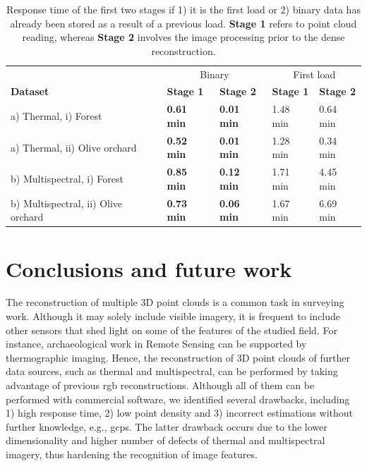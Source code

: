\renewcommand{\arraystretch}{1.2}
\begin{table}
    \sffamily
    \centering
    \caption{Response time of the first two stages if 1) it is the first load or 2) binary data has already been stored as a result of a previous load. \textbf{Stage 1} refers to point cloud reading, whereas \textbf{Stage 2} involves the image processing prior to the dense reconstruction. }
    \label{table:binary_results}
    \begin{tabular}{l|llll}
    \toprule
    & \multicolumn{2}{c}{Binary} & \multicolumn{2}{c}{First load}\\
    \cmidrule{1-5}
    \textbf{Dataset} & \textbf{Stage 1} & \textbf{Stage 2} & \textbf{Stage 1} & \textbf{Stage 2}\\
    \cmidrule{1-5}
    a) Thermal, i) Forest & \textbf{0.61 \si{\minute}} & \textbf{0.01 \si{\minute}} & 1.48 \si{\minute} & 0.64 \si{\minute}\\
    \cmidrule{1-5}
    a) Thermal, ii) Olive orchard & \textbf{0.52 \si{\minute}} & \textbf{0.01 \si{\minute}} & 1.28 \si{\minute} & 0.34 \si{\minute}\\
    \cmidrule{1-5}
    b) Multispectral, i) Forest & \textbf{0.85 \si{\minute}} & \textbf{0.12 \si{\minute}} & 1.71 \si{\minute} & 4.45 \si{\minute}\\
    \cmidrule{1-5}
    b) Multispectral, ii) Olive orchard & \textbf{0.73 \si{\minute}} & \textbf{0.06 \si{\minute}} & 1.67 \si{\minute} & 6.69 \si{\minute}\\
    \bottomrule
    \end{tabular}
\end{table}
\renewcommand{\arraystretch}{1}

\section{Conclusions and future work}

The reconstruction of multiple 3D point clouds is a common task in surveying work. Although it may solely include visible imagery, it is frequent to include other sensors that shed light on some of the features of the studied field. For instance, archaeological work in Remote Sensing can be supported by thermographic imaging. Hence, the reconstruction of 3D point clouds of further data sources, such as thermal and multispectral, can be performed by taking advantage of previous \acrshort{rgb} reconstructions. Although all of them can be performed with commercial software, we identified several drawbacks, including 1) high response time, 2) low point density and 3) incorrect estimations without further knowledge, e.g., \acrshort{gcp}s. The latter drawback occurs due to the lower dimensionality and higher number of defects of thermal and multispectral imagery, thus hardening the recognition of image features.

